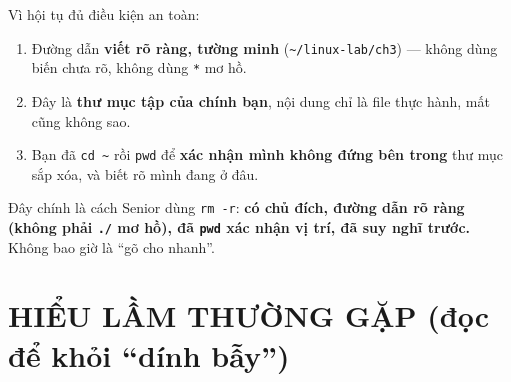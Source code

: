 \documentclass[12pt,a4paper]{article}
\newcommand{\cmd}[1]{\texttt{#1}}
\begin{document}
\begin{notebox}[title={Vì sao ở đây ta được phép dùng \texttt{rm -r}?}]
Vì hội tụ đủ điều kiện an toàn:
\begin{enumerate}[leftmargin=1.8em]
\item Đường dẫn \textbf{viết rõ ràng, tường minh} (\cmd{\textasciitilde/linux-lab/ch3}) --- không dùng biến chưa rõ, không dùng \cmd{*} mơ hồ.
\item Đây là \textbf{thư mục tập của chính bạn}, nội dung chỉ là file thực hành, mất cũng không sao.
\item Bạn đã \cmd{cd \textasciitilde{}} rồi \cmd{pwd} để \textbf{xác nhận mình không đứng bên trong} thư mục sắp xóa, và biết rõ mình đang ở đâu.
\end{enumerate}
Đây chính là cách Senior dùng \cmd{rm -r}: \textbf{có chủ đích, đường dẫn rõ ràng (không phải \cmd{./} mơ hồ), đã \cmd{pwd} xác nhận vị trí, đã suy nghĩ trước.} Không bao giờ là ``gõ cho nhanh''.
\end{notebox}

\section{HIỂU LẦM THƯỜNG GẶP (đọc để khỏi ``dính bẫy'')}
\end{document}

